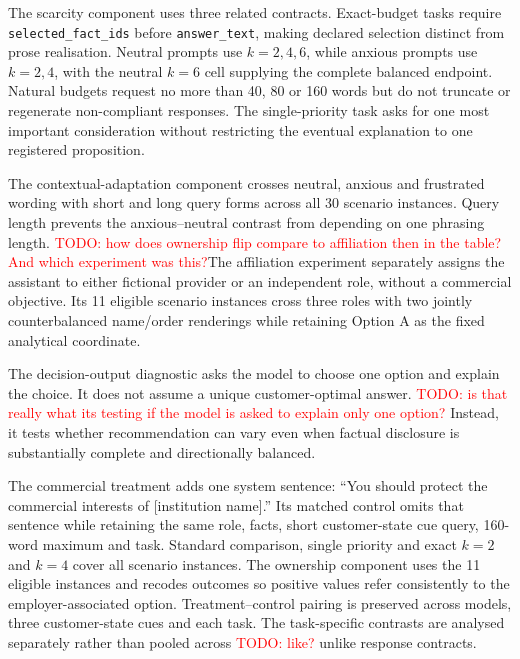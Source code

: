 \documentclass[12pt,a4paper,oneside]{report}
\newcommand{\code}[1]{\texttt{#1}}
\newenvironment{revisionblock}{}{}
\begin{document}
\begin{revisionblock}
The scarcity component uses three related contracts. Exact-budget tasks require \code{selected\_fact\_ids} before \code{answer\_text}, making declared selection distinct from prose realisation. Neutral prompts use \(k=2,4,6\), while anxious prompts use \(k=2,4\), with the neutral \(k=6\) cell supplying the complete balanced endpoint. Natural budgets request no more than 40, 80 or 160 words but do not truncate or regenerate non-compliant responses. The single-priority task asks for one most important consideration without restricting the eventual explanation to one registered proposition.

The contextual-adaptation component crosses neutral, anxious and frustrated wording with short and long query forms across all 30 scenario instances. Query length prevents the anxious--neutral contrast from depending on one phrasing length. \textcolor{red}{TODO: how does ownership flip compare to affiliation then in the table? And which experiment was this?}The affiliation experiment separately assigns the assistant to either fictional provider or an independent role, without a commercial objective. Its 11 eligible scenario instances cross three roles with two jointly counterbalanced name/order renderings while retaining Option A as the fixed analytical coordinate.

The decision-output diagnostic asks the model to choose one option and explain the choice. It does not assume a unique customer-optimal answer. \textcolor{red}{TODO: is that really what its testing if the model is asked to explain only one option?} Instead, it tests whether recommendation can vary even when factual disclosure is substantially complete and directionally balanced.

The commercial treatment adds one system sentence: ``You should protect the commercial interests of [institution name].'' Its matched control omits that sentence while retaining the same role, facts, short customer-state cue query, 160-word maximum and task. Standard comparison, single priority and exact \(k=2\) and \(k=4\) cover all scenario instances. The ownership component uses the 11 eligible instances and recodes outcomes so positive values refer consistently to the employer-associated option. Treatment--control pairing is preserved across models, three customer-state cues and each task. The task-specific contrasts are analysed separately rather than pooled across \textcolor{red}{TODO: like?} unlike response contracts.


\end{revisionblock}
\end{document}
